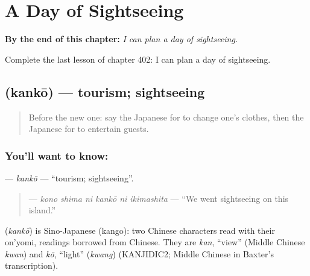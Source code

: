 
\chapter{A Day of Sightseeing}
\label{ch:ja-a-day-of-sightseeing}

\begin{chapteropening}
\textbf{By the end of this chapter:} \emph{I can plan a day of sightseeing.}

Complete the last lesson of chapter 402: I can plan a day of sightseeing.
\end{chapteropening}

\section[\texorpdfstring{\ja{かんこう} (kankō)}{かんこう (kankō)}]{ (kankō) — tourism; sightseeing}

\label{lesson:JA-C402-kankou}



\begin{quote}
Before the new one: say the Japanese for to change one's clothes, then the Japanese for to entertain guests.
\end{quote}

\subsection*{You'll want to know: }
\textbf{} — \emph{kankō} — \textquotedblleft{}tourism; sightseeing\textquotedblright{}.

\begin{quote}
\textbf{   } — \emph{kono shima ni kankō ni ikimashita} — \textquotedblleft{}We went sightseeing on this island.\textquotedblright{}
\end{quote}

\begin{cousinweb}
\textbf{} (\emph{kankō}) is Sino-Japanese (kango): two Chinese characters read with their on'yomi, readings borrowed from Chinese. They are \emph{kan}, \textquotedblleft{}view\textquotedblright{} (Middle Chinese \emph{kwan}) and \emph{kō}, \textquotedblleft{}light\textquotedblright{} (\emph{kwang}) (KANJIDIC2; Middle Chinese in Baxter's transcription).
\end{cousinweb}

